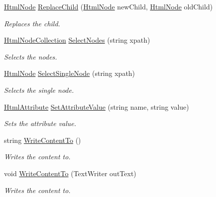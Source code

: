\begin{DoxyCompactItemize}
\hyperlink{class_html_agility_pack_1_1_html_node}{Html\+Node} \hyperlink{class_html_agility_pack_1_1_html_node_a17e6fac6c6e8189d1aae612fe66a9924}{Replace\+Child} (\hyperlink{class_html_agility_pack_1_1_html_node}{Html\+Node} new\+Child, \hyperlink{class_html_agility_pack_1_1_html_node}{Html\+Node} old\+Child)
\begin{DoxyCompactList}\small\item\em Replaces the child. \end{DoxyCompactList}\item 
\hyperlink{class_html_agility_pack_1_1_html_node_collection}{Html\+Node\+Collection} \hyperlink{class_html_agility_pack_1_1_html_node_a318c0ba0b18bd3e02cd71d28eded83ab}{Select\+Nodes} (string xpath)
\begin{DoxyCompactList}\small\item\em Selects the nodes. \end{DoxyCompactList}\item 
\hyperlink{class_html_agility_pack_1_1_html_node}{Html\+Node} \hyperlink{class_html_agility_pack_1_1_html_node_aa3fda9875d81027009b9d15b51c77add}{Select\+Single\+Node} (string xpath)
\begin{DoxyCompactList}\small\item\em Selects the single node. \end{DoxyCompactList}\item 
\hyperlink{class_html_agility_pack_1_1_html_attribute}{Html\+Attribute} \hyperlink{class_html_agility_pack_1_1_html_node_af889300d83126b6b6bcf99af3d5c6a89}{Set\+Attribute\+Value} (string name, string value)
\begin{DoxyCompactList}\small\item\em Sets the attribute value. \end{DoxyCompactList}\item 
string \hyperlink{class_html_agility_pack_1_1_html_node_a9fa855e558b47c6e03aa278c4b0fa673}{Write\+Content\+To} ()
\begin{DoxyCompactList}\small\item\em Writes the content to. \end{DoxyCompactList}\item 
void \hyperlink{class_html_agility_pack_1_1_html_node_a7beed28da2479eab4a30b7bac22403ad}{Write\+Content\+To} (Text\+Writer out\+Text)
\begin{DoxyCompactList}\small\item\em Writes the content to. \end{DoxyCompactList}\item 

\end{DoxyCompactItemize}
